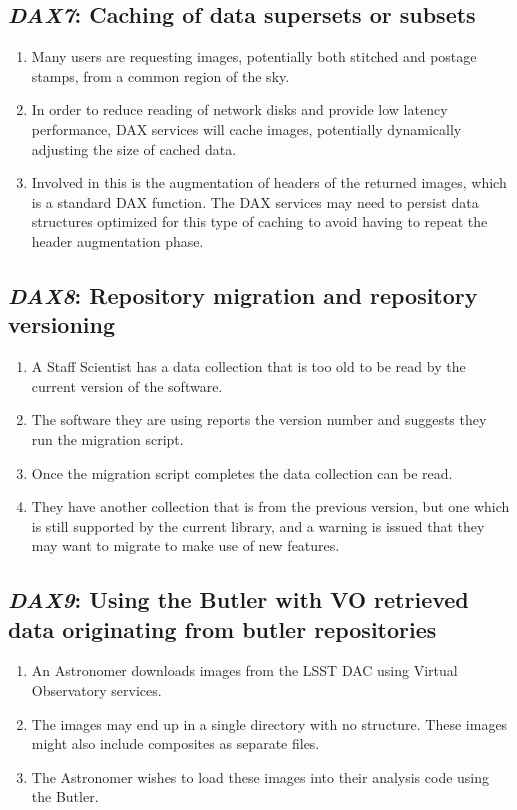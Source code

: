 \documentclass[DM,toc,lsstdraft]{lsstdoc}
\newcommand{\usecase}[3]{%
\subsection{\emph{#1}: #2}
\label{use:#1}
\begin{enumerate}[label=\alph*.]
#3
\end{enumerate}
}
\begin{document}
\usecase{DAX7}{Caching of data supersets or subsets}{%

\item
Many users are requesting images, potentially both stitched and postage stamps, from a common region of the sky.

\item
In order to reduce reading of network disks and provide low latency performance, DAX services will cache images, potentially dynamically adjusting the size of cached data.

\item
Involved in this is the augmentation of headers of the returned images, which is a standard DAX function.
The DAX services may need to persist data structures optimized for this type of caching to avoid having to repeat the header augmentation phase.

}

\usecase{DAX8}{Repository migration and repository versioning}{%

\item
A Staff Scientist has a data collection that is too old to be read by the current version of the software.

\item
The software they are using reports the version number and suggests they run the migration script.

\item
Once the migration script completes the data collection can be read.

\item
They have another collection that is from the previous version, but one which is still supported by the current library, and a warning is issued that they may want to migrate to make use of new features.

}

\usecase{DAX9}{Using the Butler with VO retrieved data originating from butler repositories}{%

\item
An Astronomer downloads images from the LSST DAC using Virtual Observatory services.

\item
The images may end up in a single directory with no structure.
These images might also include composites as separate files.

\item
The Astronomer wishes to load these images into their analysis code using the Butler.

}
\end{document}
